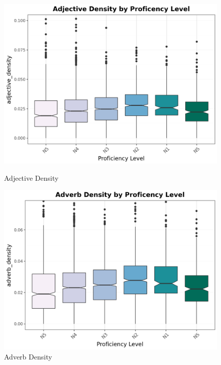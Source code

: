 \begin{figure}[htbp]
    \centering
    \begin{minipage}{.48\textwidth}
        \centering
    \includegraphics[scale=.4]{img/AdjDen}
    \caption[Adjective Density Across JLPT Proficiency Levels]{Adjective Density}
        \label{fig:adjDen}
    \end{minipage}
    \hfill
\begin{minipage}{.48\textwidth}
        \centering
        \includegraphics[scale=.4]{img/AdvDen}
        \caption[Adverb Density Across JLPT Proficiency Levels]{Adverb Density}
\label{fig:advDen}
\end{minipage}
    \end{figure}

